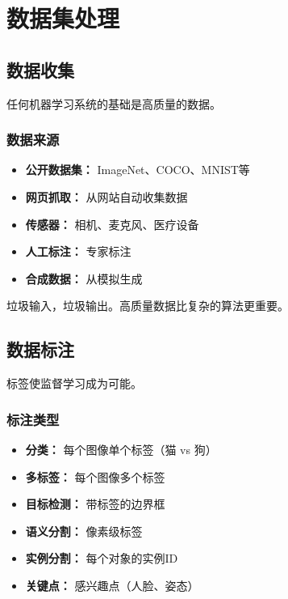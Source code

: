 %

\clearpage
\cleardoublepage

\chapter{数据集处理}

\section{数据收集}

任何机器学习系统的基础是高质量的数据。

\subsection{数据来源}

\begin{itemize}
    \item \textbf{公开数据集：} ImageNet、COCO、MNIST等
    \item \textbf{网页抓取：} 从网站自动收集数据
    \item \textbf{传感器：} 相机、麦克风、医疗设备
    \item \textbf{人工标注：} 专家标注
    \item \textbf{合成数据：} 从模拟生成
\end{itemize}

\begin{note}[数据质量]
垃圾输入，垃圾输出。高质量数据比复杂的算法更重要。
\end{note}

\section{数据标注}

标签使监督学习成为可能。

\subsection{标注类型}

\begin{itemize}
    \item \textbf{分类：} 每个图像单个标签（猫 vs 狗）
    \item \textbf{多标签：} 每个图像多个标签
    \item \textbf{目标检测：} 带标签的边界框
    \item \textbf{语义分割：} 像素级标签
    \item \textbf{实例分割：} 每个对象的实例ID
    \item \textbf{关键点：} 感兴趣点（人脸、姿态）
\end{itemize}

